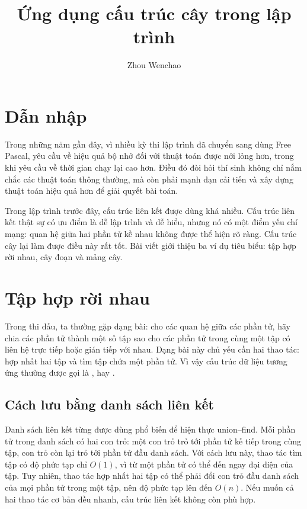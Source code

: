 \documentclass[11pt]{article}
\title{Ứng dụng cấu trúc cây trong lập trình}
\author{Zhou Wenchao}
\date{}
\begin{document}
\maketitle


\renewcommand{\contentsname}{Mục lục}
\tableofcontents

\section{Dẫn nhập}

Trong những năm gần đây, vì nhiều kỳ thi lập trình đã chuyển sang dùng
Free Pascal, yêu cầu về hiệu quả bộ nhớ đối với thuật toán được nới lỏng hơn,
trong khi yêu cầu về thời gian chạy lại cao hơn. Điều đó đòi hỏi thí sinh
không chỉ nắm chắc các thuật toán thông thường, mà còn phải mạnh dạn cải tiến
và xây dựng thuật toán hiệu quả hơn để giải quyết bài toán.

Trong lập trình trước đây, cấu trúc liên kết được dùng khá nhiều. Cấu trúc
liên kết thật sự có ưu điểm là dễ lập trình và dễ hiểu, nhưng nó có một điểm
yếu chí mạng: quan hệ giữa hai phần tử kề nhau không được thể hiện rõ ràng.
Cấu trúc cây lại làm được điều này rất tốt. Bài viết giới thiệu ba ví dụ tiêu
biểu: tập hợp rời nhau, cây đoạn và mảng cây.

\section{Tập hợp rời nhau}

Trong thi đấu, ta thường gặp dạng bài: cho các quan hệ giữa các phần tử, hãy
chia các phần tử thành một số tập sao cho các phần tử trong cùng một tập có
liên hệ trực tiếp hoặc gián tiếp với nhau. Dạng bài này chủ yếu cần hai thao
tác: hợp nhất hai tập và tìm tập chứa một phần tử. Vì vậy cấu trúc dữ liệu
tương ứng thường được gọi là , hay .

\subsection{Cách lưu bằng danh sách liên kết}

Danh sách liên kết từng được dùng phổ biến để hiện thực union--find. Mỗi phần
tử trong danh sách có hai con trỏ: một con trỏ trỏ tới phần tử kế tiếp trong
cùng tập, con trỏ còn lại trỏ tới phần tử đầu danh sách. Với cách lưu này,
thao tác tìm tập có độ phức tạp chỉ \(O(1)\), vì từ một phần tử có thể đến
ngay đại diện của tập. Tuy nhiên, thao tác hợp nhất hai tập có thể phải đổi
con trỏ đầu danh sách của mọi phần tử trong một tập, nên độ phức tạp lên đến
\(O(n)\). Nếu muốn cả hai thao tác cơ bản đều nhanh, cấu trúc liên kết không
còn phù hợp.
\end{document}
